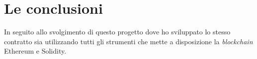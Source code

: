
\section{Le conclusioni}
In seguito allo svolgimento di questo progetto dove ho sviluppato lo stesso contratto sia utilizzando tutti gli strumenti che mette a disposizione la \textit{blockchain} Ethereum e Solidity. 

